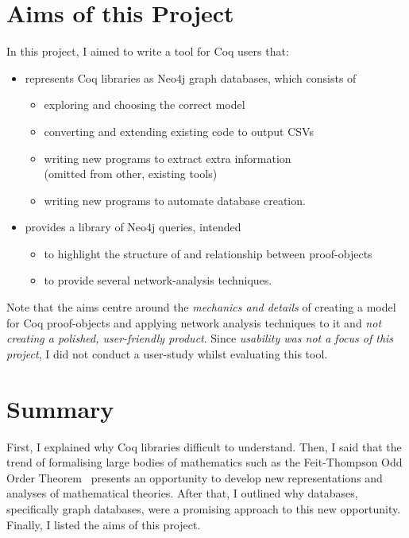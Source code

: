 \section{Aims of this Project}\label{intro:aims}

In this project, I aimed to write a tool for Coq users that:

\begin{itemize}
\item represents Coq libraries as Neo4j graph databases, which consists of
  \begin{itemize}
  \item exploring and choosing the correct model
  \item converting and extending existing code to output CSVs
  \item writing new programs to extract extra information \\
      (omitted from other, existing tools)
  \item writing new programs to automate database creation.
  \end{itemize}

\item provides a library of Neo4j queries, intended
  \begin{itemize}
  \item to highlight the structure of and relationship between proof-objects
  \item to provide several network-analysis techniques.
  \end{itemize}
\end{itemize}

Note that the aims centre around the \emph{mechanics and details} of creating a
model for Coq proof-objects and applying network analysis techniques to it and
\emph{not creating a polished, user-friendly product}. Since \emph{usability was
not a focus of this project}, I did not conduct a user-study whilst evaluating
this tool.

\section{Summary}

First, I explained why Coq libraries difficult to understand. Then, I said
that the trend of formalising large bodies of mathematics such as the
Feit-Thompson Odd Order Theorem~\cite{peterfalvi2000oot, bender1994oot}
presents an opportunity to develop new representations and analyses of
mathematical theories. After that, I outlined why databases, specifically
graph databases, were a promising approach to this new opportunity. Finally, I
listed the aims of this project.
